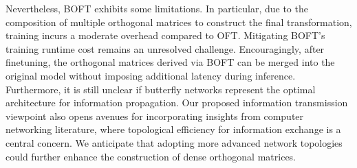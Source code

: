 Nevertheless, BOFT exhibits some limitations. In particular, due to the composition of multiple orthogonal matrices to construct the final transformation, training incurs a moderate overhead compared to OFT. Mitigating BOFT's training runtime cost remains an unresolved challenge. Encouragingly, after finetuning, the orthogonal matrices derived via BOFT can be merged into the original model without imposing additional latency during inference. Furthermore, it is still unclear if butterfly networks represent the optimal architecture for information propagation. Our proposed information transmission viewpoint also opens avenues for incorporating insights from computer networking literature, where topological efficiency for information exchange is a central concern. We anticipate that adopting more advanced network topologies could further enhance the construction of dense orthogonal matrices.